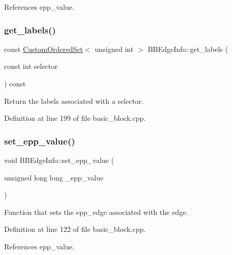 References epp\+\_\+value.

\mbox{\label{structBBEdgeInfo_a2259bc2b4c16fe15f466b9817d434fdd}} 
\subsubsection{\texorpdfstring{get\+\_\+labels()}{get\_labels()}}
{\footnotesize\ttfamily const \hyperlink{classCustomOrderedSet}{Custom\+Ordered\+Set}$<$ unsigned int $>$ B\+B\+Edge\+Info\+::get\+\_\+labels (\begin{DoxyParamCaption}\item[{const int}]{selector }\end{DoxyParamCaption}) const}



Return the labels associated with a selector. 



Definition at line 199 of file basic\+\_\+block.\+cpp.

\mbox{\label{structBBEdgeInfo_a0302c7282b7118a9ee001c3f57d8c288}} 
\subsubsection{\texorpdfstring{set\+\_\+epp\+\_\+value()}{set\_epp\_value()}}
{\footnotesize\ttfamily void B\+B\+Edge\+Info\+::set\+\_\+epp\+\_\+value (\begin{DoxyParamCaption}\item[{unsigned long long}]{\+\_\+epp\+\_\+value }\end{DoxyParamCaption})}



Function that sets the epp\+\_\+edge associated with the edge. 



Definition at line 122 of file basic\+\_\+block.\+cpp.



References epp\+\_\+value.

\mbox{\label{structBBEdgeInfo_af2e3b55b373c466d44827066e506ee68}} 

